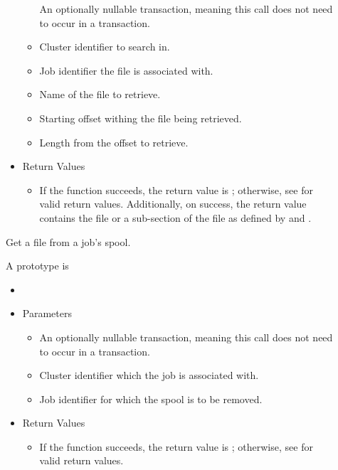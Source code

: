 \begin{description}
\begin{itemize}
\begin{itemize}
      An optionally nullable transaction, meaning this call does not 
      need to occur in a transaction. 
      \item[]  

      Cluster identifier to search in.
      \item[] 

      Job identifier the file is associated with.
      \item[] 

      Name of the file to retrieve.
      \item[]  

      Starting offset withing the file being retrieved.
      \item[] 

      Length from the offset to retrieve.
    \end{itemize}
    \item[] Return Values
    \begin{itemize}
      \item[] If the function succeeds, the return value is ; 
      otherwise, see  for valid return values. Additionally,
      on success, the return value contains the file or a sub-section of the
      file as defined by  and .
    \end{itemize}
  \end{itemize}  
  
  Get a file from a job's spool.
\item [\Code{closeSpool}]
  A prototype is 

  \begin{itemize}
    \item[]       
    \item[] Parameters
    \begin{itemize}
      \item[]  

      An optionally nullable transaction, meaning this call does not 
      need to occur in a transaction. 
      \item[]  

      Cluster identifier which the job is associated with. 
      \item[] 

      Job identifier for which the spool is to be removed.
    \end{itemize}
    \item[] Return Values
    \begin{itemize}
      \item[] If the function succeeds, the return value is ; 
      otherwise, see  for valid return values.
    \end{itemize}
  \end{itemize}  


\end{description}
